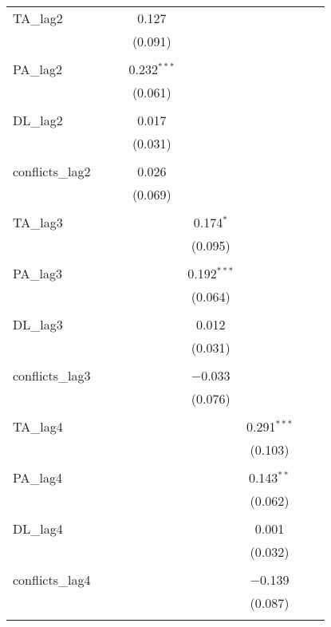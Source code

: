 \begin{table}[!htbp]
\begin{tabular}{@{\extracolsep{5pt}}lccccccc}
 TA\_lag2 &  &  & 0.127 &  &  &  &  \\ 
  &  &  & (0.091) &  &  &  &  \\ 
  & & & & & & & \\ 
 PA\_lag2 &  &  & 0.232$^{***}$ &  &  &  &  \\ 
  &  &  & (0.061) &  &  &  &  \\ 
  & & & & & & & \\ 
 DL\_lag2 &  &  & 0.017 &  &  &  &  \\ 
  &  &  & (0.031) &  &  &  &  \\ 
  & & & & & & & \\ 
 conflicts\_lag2 &  &  & 0.026 &  &  &  &  \\ 
  &  &  & (0.069) &  &  &  &  \\ 
  & & & & & & & \\ 
 TA\_lag3 &  &  &  & 0.174$^{*}$ &  &  &  \\ 
  &  &  &  & (0.095) &  &  &  \\ 
  & & & & & & & \\ 
 PA\_lag3 &  &  &  & 0.192$^{***}$ &  &  &  \\ 
  &  &  &  & (0.064) &  &  &  \\ 
  & & & & & & & \\ 
 DL\_lag3 &  &  &  & 0.012 &  &  &  \\ 
  &  &  &  & (0.031) &  &  &  \\ 
  & & & & & & & \\ 
 conflicts\_lag3 &  &  &  & $-$0.033 &  &  &  \\ 
  &  &  &  & (0.076) &  &  &  \\ 
  & & & & & & & \\ 
 TA\_lag4 &  &  &  &  & 0.291$^{***}$ &  &  \\ 
  &  &  &  &  & (0.103) &  &  \\ 
  & & & & & & & \\ 
 PA\_lag4 &  &  &  &  & 0.143$^{**}$ &  &  \\ 
  &  &  &  &  & (0.062) &  &  \\ 
  & & & & & & & \\ 
 DL\_lag4 &  &  &  &  & 0.001 &  &  \\ 
  &  &  &  &  & (0.032) &  &  \\ 
  & & & & & & & \\ 
 conflicts\_lag4 &  &  &  &  & $-$0.139 &  &  \\ 
  &  &  &  &  & (0.087) &  &  \\ 
  & & & & & & & \\ 

\end{tabular}
\end{table}
